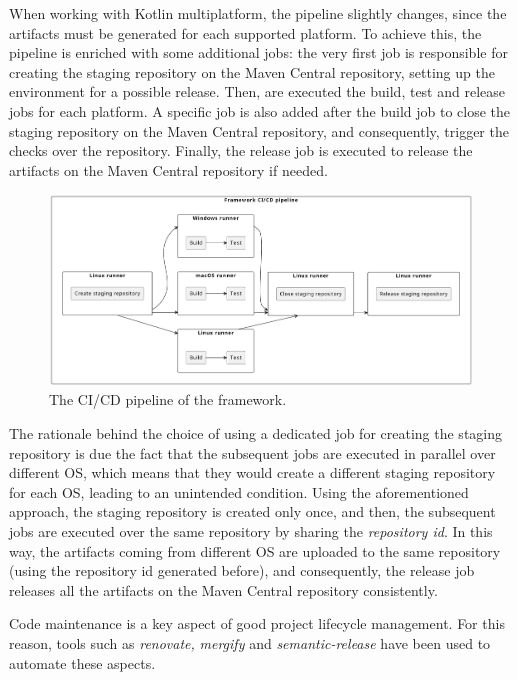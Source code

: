 When working with Kotlin multiplatform, the pipeline slightly changes, since the artifacts must be generated for each supported platform.
To achieve this, the pipeline is enriched with some additional jobs: the very first job is responsible for creating the staging repository on the
Maven Central repository, setting up the environment for a possible release. Then, are executed the build, test and release jobs for each platform.
A specific job is also added after the build job to close the staging repository on the Maven Central repository, and consequently, trigger the
checks over the repository. Finally, the release job is executed to release the artifacts on the Maven Central repository if needed.

\begin{figure}
	\centering
	\includegraphics[width=\textwidth]{figures/framework-ci.pdf}
	\caption{The CI/CD pipeline of the framework.}
	\label{fig:ci-cd-pipeline}
\end{figure}

The rationale behind the choice of using a dedicated job for creating the staging repository is due the fact that the subsequent jobs are executed
in parallel over different OS, which means that they would create a different staging repository for each OS, leading to an unintended condition.
Using the aforementioned approach, the staging repository is created only once, and then, the subsequent jobs are executed over the same repository
by sharing the \emph{repository id}. In this way, the artifacts coming from different OS are uploaded to the same repository (using the repository id
generated before), and consequently, the release job releases all the artifacts on the Maven Central repository consistently.

Code maintenance is a key aspect of good project lifecycle management.
For this reason, tools such as \emph{renovate,} \emph{mergify} and \emph{semantic-release} have been used to automate these aspects.

